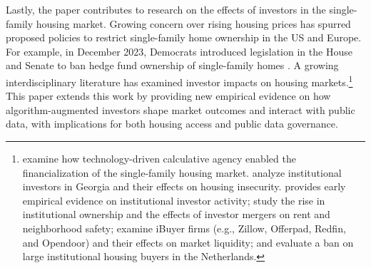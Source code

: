 \documentclass[11pt]{article}
\begin{document}
Lastly, the paper contributes to research on the effects of investors in the single-family housing market. Growing concern over rising housing prices has spurred proposed policies to restrict single-family home ownership in the US and Europe. For example, in December 2023, Democrats introduced legislation in the House and Senate to ban hedge fund ownership of single-family homes \citep{kaysenNewLegislationProposes2023, merkleyEndHedgeFund}. A growing interdisciplinary literature has examined investor impacts on housing markets.\footnote{\citet{fields2018a, fields2022a} examine how technology-driven calculative agency enabled the financialization of the single-family housing market. \citet{raymondCorporateLandlordsInstitutional2016, raymondForeclosureEvictionHousing2018, raymondGentrifyingAtlantaInvestor2021} analyze institutional investors in Georgia and their effects on housing insecurity. \citet{millsLargeScaleBuy2019} provides early empirical evidence on institutional investor activity; \citet{gurun2023} study the rise in institutional ownership and the effects of investor mergers on rent and neighborhood safety; \citet{buchak2022} examine iBuyer firms (e.g., Zillow, Offerpad, Redfin, and Opendoor) and their effects on market liquidity; and \citet{franckeBuytoLiveVsBuytoLet2023} evaluate a ban on large institutional housing buyers in the Netherlands.} This paper extends this work by providing new empirical evidence on how algorithm-augmented investors shape market outcomes and interact with public data, with implications for both housing access and public data governance.
\end{document}
